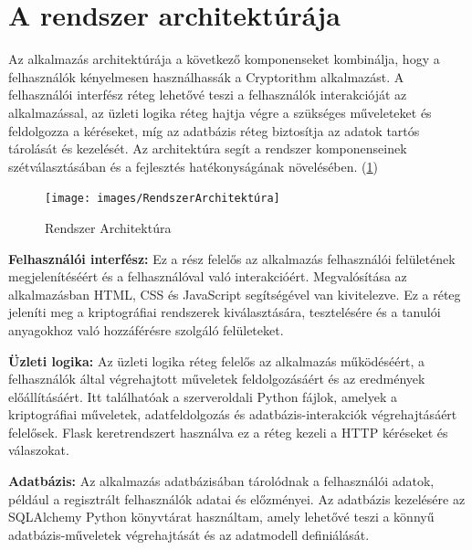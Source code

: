 \newpage
\section{A rendszer architektúrája}
Az alkalmazás architektúrája a következő komponenseket kombinálja, hogy a felhasználók kényelmesen használhassák a Cryptorithm alkalmazást. A felhasználói interfész réteg lehetővé teszi a felhasználók interakcióját az alkalmazással, az üzleti logika réteg hajtja végre a szükséges műveleteket és feldolgozza a kéréseket, míg az adatbázis réteg biztosítja az adatok tartós tárolását és kezelését. Az architektúra segít a rendszer komponenseinek szétválasztásában és a fejlesztés hatékonyságának növelésében.  (\ref{fig:fileArch})

\begin{figure}[!h]
	\centering
	\texttt{[image: images/RendszerArchitektúra]}
	\caption{Rendszer Architektúra}
	\label{fig:fileArch}
\end{figure}

\textbf{Felhasználói interfész:} Ez a rész felelős az alkalmazás felhasználói felületének megjelenítéséért és a felhasználóval való interakcióért. Megvalósítása az alkalmazásban HTML, CSS és JavaScript segítségével van kivitelezve. Ez a réteg jeleníti meg a kriptográfiai rendszerek kiválasztására, tesztelésére és a tanulói anyagokhoz való hozzáférésre szolgáló felületeket.

\textbf{Üzleti logika:} Az üzleti logika réteg felelős az alkalmazás működéséért, a felhasználók által végrehajtott műveletek feldolgozásáért és az eredmények előállításáért. Itt találhatóak a szerveroldali Python fájlok, amelyek a kriptográfiai műveletek, adatfeldolgozás és adatbázis-interakciók végrehajtásáért felelősek. Flask keretrendszert használva ez a réteg kezeli a HTTP kéréseket és válaszokat.

\textbf{Adatbázis:} Az alkalmazás adatbázisában tárolódnak a felhasználói adatok, például a regisztrált felhasználók adatai és előzményei. Az adatbázis kezelésére az SQLAlchemy Python könyvtárat használtam, amely lehetővé teszi a könnyű adatbázis-műveletek végrehajtását és az adatmodell definiálását.


